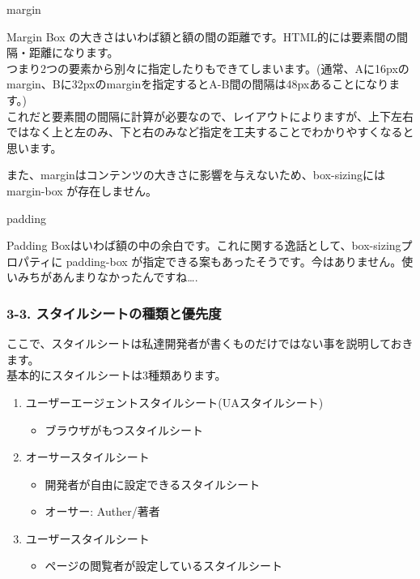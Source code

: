 margin

Margin Box
の大きさはいわば額と額の間の距離です。HTML的には要素間の間隔・距離になります。\\
つまり2つの要素から別々に指定したりもできてしまいます。(通常、Aに16pxのmargin、Bに32pxのmarginを指定するとA-B間の間隔は48pxあることになります。)\\
これだと要素間の間隔に計算が必要なので、レイアウトによりますが、上下左右ではなく上と左のみ、下と右のみなど指定を工夫することでわかりやすくなると思います。

また、marginはコンテンツの大きさに影響を与えないため、box-sizingには
margin-box が存在しません。

padding

Padding
Boxはいわば額の中の余白です。これに関する逸話として、box-sizingプロパティに
padding-box
が指定できる案もあったそうです。今はありません。使いみちがあんまりなかったんですね\ldots.🥺

\subsubsection{3-3.
スタイルシートの種類と優先度}\label{ux30b9ux30bfux30a4ux30ebux30b7ux30fcux30c8ux306eux7a2eux985eux3068ux512aux5148ux5ea6}

ここで、スタイルシートは私達開発者が書くものだけではない事を説明しておきます。\\
基本的にスタイルシートは3種類あります。

\begin{enumerate}
\def\labelenumi{\arabic{enumi}.}
\tightlist
\item
  ユーザーエージェントスタイルシート(UAスタイルシート)

  \begin{itemize}
  \tightlist
  \item
    ブラウザがもつスタイルシート
  \end{itemize}
\item
  オーサースタイルシート

  \begin{itemize}
  \tightlist
  \item
    開発者が自由に設定できるスタイルシート
  \item
    オーサー: Auther/著者
  \end{itemize}
\item
  ユーザースタイルシート

  \begin{itemize}
  \tightlist
  \item
    ページの閲覧者が設定しているスタイルシート
  \end{itemize}
\end{enumerate}

